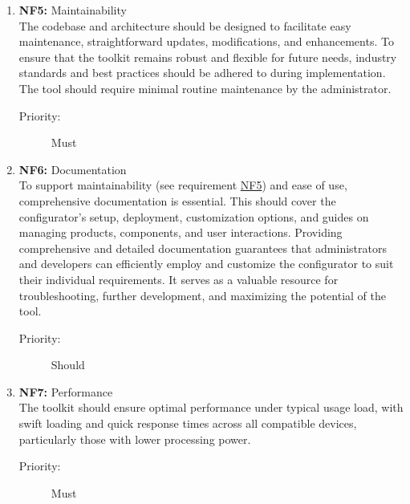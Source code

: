 \begin{enumerate}
\item \textbf{NF5:} \label{itm:NF5} Maintainability
\vspace{2pt}
\\The codebase and architecture should be designed to facilitate easy maintenance, straightforward updates, modifications, and enhancements. To ensure that the toolkit remains robust and flexible for future needs, industry standards and best practices should be adhered to during implementation. The tool should require minimal routine maintenance by the administrator.
\begin{description}
    \item[Priority:] Must
\end{description}
\vspace{4pt}

\item \textbf{NF6:} Documentation
\vspace{2pt}
\\To support maintainability (see requirement \hyperref[itm:NF5]{NF5}) and ease of use, comprehensive documentation is essential. This should cover the configurator's setup, deployment, customization options, and guides on managing products, components, and user interactions. Providing comprehensive and detailed documentation guarantees that administrators and developers can efficiently employ and customize the configurator to suit their individual requirements. It serves as a valuable resource for troubleshooting, further development, and maximizing the potential of the tool.
\begin{description}
    \item[Priority:] Should
\end{description}
\vspace{4pt}

\item \textbf{NF7:} Performance
\vspace{2pt}
\\The toolkit should ensure optimal performance under typical usage load, with swift loading and quick response times across all compatible devices, particularly those with lower processing power.
\begin{description}
    \item[Priority:] Must
\end{description}
\vspace{4pt}


\end{enumerate}
